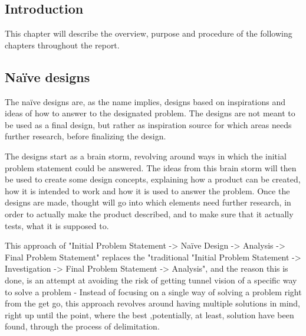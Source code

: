\subsection{Introduction}
This chapter will describe the overview, purpose and procedure of the following chapters throughout the report.

\subsection{Naïve designs}
The naïve designs are, as the name implies, designs based on inspirations and ideas of how to answer to the designated problem. The designs are not meant to be used as a final design, but rather as inspiration source for which areas needs further research, before finalizing the design.

The designs start as a brain storm, revolving around ways in which the initial problem statement could be answered. The ideas from this brain storm will then be used to create some design concepts, explaining how a product can be created, how it is intended to work and how it is used to answer the problem. Once the designs are made, thought will go into which elements need further research, in order to actually make the product described, and to make sure that it actually tests, what it is supposed to.

This approach of "Initial Problem Statement -> Naïve Design -> Analysis -> Final Problem Statement" replaces the "traditional "Initial Problem Statement -> Investigation -> Final Problem Statement -> Analysis", and the reason this is done, is an attempt at avoiding the risk of getting tunnel vision of a specific way to solve a problem - Instead of focusing on a single way of solving a problem right from the get go, this approach revolves around having multiple solutions in mind, right up until the point, where the best ,potentially, at least, solution have been found, through the process of delimitation.

